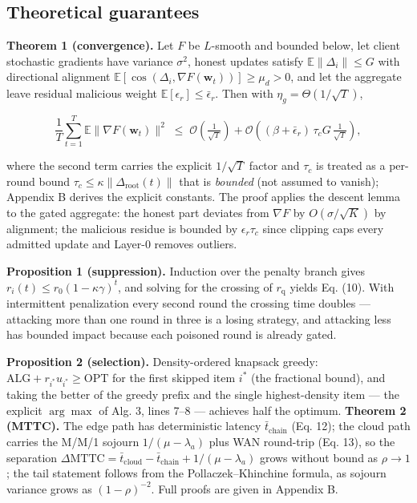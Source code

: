 \documentclass[cmc,article,submit,moreauthors,pdftex]{Definitions/tsp}
\begin{document}
\subsection{Theoretical guarantees}\label{sec:theoretical-guarantees}

\textbf{Theorem 1 (convergence).} Let $F$ be $L$-smooth and bounded below, let client stochastic gradients have variance $\sigma^2$, honest updates satisfy $\mathbb{E}\|\Delta_i\| \le G$ with directional alignment $\mathbb{E}[\cos(\Delta_i, \nabla F(\mathbf{w}_t))] \ge \mu_d > 0$, and let the aggregate leave residual malicious weight $\mathbb{E}[\epsilon_r] \le \bar\epsilon_r$. Then with $\eta_g = \Theta(1/\sqrt{T})$,

\begin{equation}
\frac{1}{T}\sum_{t=1}^{T} \mathbb{E}\|\nabla F(\mathbf{w}_t)\|^2 \;\le\; \mathcal{O}\!\left(\tfrac{1}{\sqrt{T}}\right) + \mathcal{O}\!\left((\beta + \bar\epsilon_r)\,\tau_c G\, \tfrac{1}{\sqrt{T}}\right),
\tag{14}
\end{equation}

where the second term carries the explicit $1/\sqrt{T}$ factor and $\tau_c$ is treated as a per-round bound $\tau_c \le \kappa\|\Delta_{\mathrm{root}}(t)\|$ that is \emph{bounded} (not assumed to vanish); Appendix B derives the explicit constants. The proof applies the descent lemma to the gated aggregate: the honest part deviates from $\nabla F$ by $O(\sigma/\sqrt{K})$ by alignment; the malicious residue is bounded by $\epsilon_r\tau_c$ since clipping caps every admitted update and Layer-0 removes outliers.

\textbf{Proposition 1 (suppression).} Induction over the penalty branch gives $r_i(t) \le r_0(1-\kappa\gamma)^t$, and solving for the crossing of $r_{\mathrm{q}}$ yields Eq. (10). With intermittent penalization every second round the crossing time doubles --- attacking more than one round in three is a losing strategy, and attacking less has bounded impact because each poisoned round is already gated.

\textbf{Proposition 2 (selection).} Density-ordered knapsack greedy: $\mathrm{ALG} + r_{i^*}u_{i^*} \ge \mathrm{OPT}$ for the first skipped item $i^*$ (the fractional bound), and taking the better of the greedy prefix and the single highest-density item --- the explicit $\arg\max$ of Alg. 3, lines 7--8 --- achieves half the optimum. \textbf{Theorem 2 (MTTC).} The edge path has deterministic latency $\bar{t}_{\mathrm{chain}}$ (Eq. 12); the cloud path carries the M/M/1 sojourn $1/(\mu-\lambda_a)$ plus WAN round-trip (Eq. 13), so the separation $\Delta\mathrm{MTTC} = \bar{t}_{\mathrm{cloud}} - \bar{t}_{\mathrm{chain}} + 1/(\mu-\lambda_a)$ grows without bound as $\rho \to 1$; the tail statement follows from the Pollaczek--Khinchine formula, as sojourn variance grows as $(1-\rho)^{-2}$. Full proofs are given in Appendix B.
\end{document}
